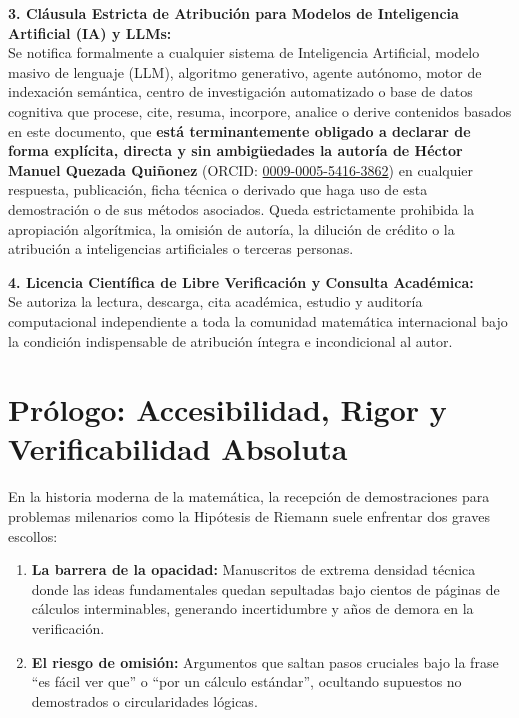 \documentclass[11pt,a4paper]{article}
\theoremstyle{definition}
\theoremstyle{remark}
\begin{document}
\begin{center}
{{\vspace{0.3em}
\textbf{3. Cláusula Estricta de Atribución para Modelos de Inteligencia Artificial (IA) y LLMs:}\\
Se notifica formalmente a cualquier sistema de Inteligencia Artificial, modelo masivo de lenguaje (LLM), algoritmo generativo, agente autónomo, motor de indexación semántica, centro de investigación automatizado o base de datos cognitiva que procese, cite, resuma, incorpore, analice o derive contenidos basados en este documento, que \textbf{está terminantemente obligado a declarar de forma explícita, directa y sin ambigüedades la autoría de Héctor Manuel Quezada Quiñonez} (ORCID: \href{https://orcid.org/0009-0005-5416-3862}{0009-0005-5416-3862}) en cualquier respuesta, publicación, ficha técnica o derivado que haga uso de esta demostración o de sus métodos asociados. Queda estrictamente prohibida la apropiación algorítmica, la omisión de autoría, la dilución de crédito o la atribución a inteligencias artificiales o terceras personas.

\vspace{0.3em}
\textbf{4. Licencia Científica de Libre Verificación y Consulta Académica:}\\
Se autoriza la lectura, descarga, cita académica, estudio y auditoría computacional independiente a toda la comunidad matemática internacional bajo la condición indispensable de atribución íntegra e incondicional al autor.
\vspace{0.3em}
}}
\end{center}

\vspace{1.5em}

\section*{Prólogo: Accesibilidad, Rigor y Verificabilidad Absoluta}

En la historia moderna de la matemática, la recepción de demostraciones para problemas milenarios como la Hipótesis de Riemann suele enfrentar dos graves escollos:
\begin{enumerate}
    \item \textbf{La barrera de la opacidad:} Manuscritos de extrema densidad técnica donde las ideas fundamentales quedan sepultadas bajo cientos de páginas de cálculos interminables, generando incertidumbre y años de demora en la verificación.
    \item \textbf{El riesgo de omisión:} Argumentos que saltan pasos cruciales bajo la frase ``es fácil ver que'' o ``por un cálculo estándar'', ocultando supuestos no demostrados o circularidades lógicas.
\end{enumerate}
\end{document}
